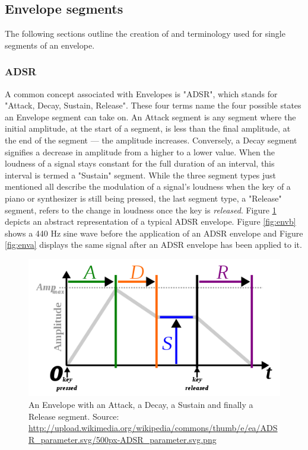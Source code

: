 \documentclass[12pt,twoside]{report}
\begin{document}
\subsection{Envelope segments}

The following sections outline the creation of and terminology used for single segments of an envelope.

\subsubsection{ADSR}

A common concept associated with Envelopes is "ADSR", which stands for "Attack, Decay, Sustain, Release". These four terms name the four possible states an Envelope segment can take on. An Attack segment is any segment where the initial amplitude, at the start of a segment, is less than the final amplitude, at the end of the segment --- the amplitude increases. Conversely, a Decay segment signifies a decrease in amplitude from a higher to a lower value. When the loudness of a signal stays constant for the full duration of an interval, this interval is termed a "Sustain" segment. While the three segment types just mentioned all describe the modulation of a signal's loudness when the key of a piano or synthesizer is still being pressed, the last segment type, a "Release" segment, refers to the change in loudness once the key is \emph{released}. Figure \ref{fig:adsr} depicts an abstract representation of a typical ADSR envelope. Figure \ref{fig:envb} shows a 440 Hz sine wave before the application of an ADSR envelope and Figure \ref{fig:enva} displays the same signal after an ADSR envelope has been applied to it.

\begin{figure}[p!]
  \includegraphics[scale=0.8]{img/adsr}
  \caption{An Envelope with an Attack, a Decay, a Sustain and finally a Release segment. Source: \protect\url{http://upload.wikimedia.org/wikipedia/commons/thumb/e/ea/ADSR_parameter.svg/500px-ADSR_parameter.svg.png}}
  \label{fig:adsr}
\end{figure}
\end{document}
